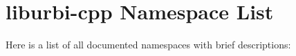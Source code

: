 \section{liburbi-cpp Namespace List}
Here is a list of all documented namespaces with brief descriptions:\begin{CompactList}
\item{}
\end{CompactList}
